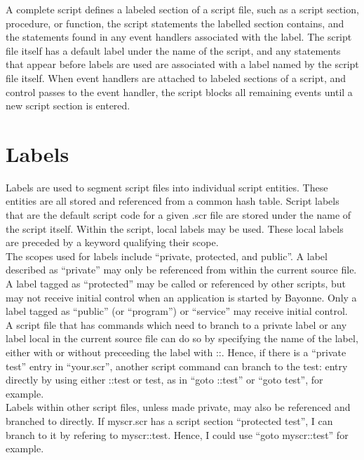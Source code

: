 \documentclass[a4paper,12pt]{article}
\begin{document}
A complete script defines a labeled section of a script file, such as a
script section, procedure, or function, the script statements the
labelled section contains, and the statements found in any event
handlers associated with the label.  The script file itself has a
default label under the name of the script, and any statements that
appear before labels are used are associated with a label named by the
script file itself. When event handlers are attached to labeled sections
of a script, and control passes to the event handler, the script blocks
all remaining events until a new script section is entered. \\

\section{Labels}

Labels are used to segment script files into individual script entities.  
These entities are all stored and referenced from a common hash table.  
Script labels that are the default script code for a given .scr file are 
stored under the name of the script itself.  Within the script, local
labels may be used.  These local labels are preceded by a keyword 
qualifying their scope. \\

The scopes used for labels include ``private, protected, and public''. 
A label described as ``private'' may only be referenced from within the
current source file.  A label tagged as ``protected'' may be called or
referenced by other scripts, but may not receive initial control when an
application is started by Bayonne.  Only a label tagged as ``public'' (or
``program'') or ``service'' may receive initial control. \\

A script file that has commands which need to branch to a private label
or any label local in the current source file can do so by specifying
the name of the label, either with or without preceeding the label with
::.  Hence, if there is a ``private test'' entry in ``your.scr'', another 
script command can branch to the test: entry directly by using either 
::test or test, as in ``goto ::test'' or ``goto test'', for example. \\

Labels within other script files, unless made private, may also be
referenced and branched to directly.  If myscr.scr has a script section
``protected test'', I can branch to it by refering to myscr::test. 
Hence, I could use ``goto myscr::test'' for example. \\
\end{document}
